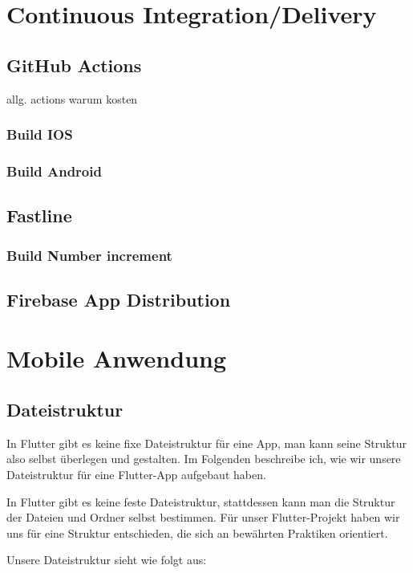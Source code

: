 \section{Continuous Integration/Delivery}
\subsection{GitHub Actions}

allg. actions warum kosten
\subsubsection{Build IOS}
\author{Martin Hausleitner}

\subsubsection{Build Android}

\subsection{Fastline}
\subsubsection{Build Number increment}
\subsection{Firebase App Distribution}

\section{Mobile Anwendung}
\subsection{Dateistruktur}
\author{Martin Hausleitner}
In Flutter gibt es keine fixe Dateistruktur für eine App,
man kann seine Struktur also selbst überlegen und gestalten.
Im Folgenden beschreibe ich, wie wir unsere Dateistruktur
für eine Flutter-App aufgebaut haben.

In Flutter gibt es keine feste Dateistruktur, stattdessen kann man die Struktur der Dateien und Ordner selbst bestimmen. Für unser Flutter-Projekt haben wir uns für eine Struktur entschieden, die sich an bewährten Praktiken orientiert.

Unsere Dateistruktur sieht wie folgt aus:

